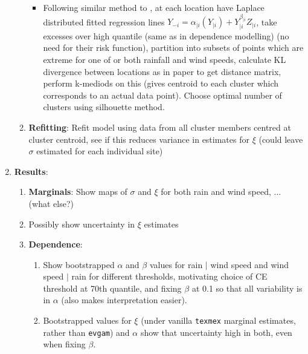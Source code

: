 \documentclass{article}
\numberwithin{equation}{section}
\begin{document}
\begin{enumerate}
\begin{enumerate}
        \begin{itemize}
          \item Following similar method to \cite{Vignotto2021}, at each location have Laplace distributed fitted regression lines $Y_{-i} = \alpha_{\mid i}(Y_{\mid i}) + Y_{\mid i}^{\beta_{\mid i}} Z_{\mid i}$, take excesses over high quantile (same as in dependence modelling) (no need for their risk function), partition into subsets of points which are extreme for one of or both rainfall and wind speeds, calculate KL divergence between locations as in paper to get distance matrix, perform k-mediods on this (gives centroid to each cluster which corresponds to an actual data point). Choose optimal number of clusters using silhouette method. 
        \end{itemize}
      \item \textbf{Refitting}: Refit model using data from all cluster members centred at cluster centroid, see if this reduces variance in estimates for $\xi$ (could leave $\sigma$ estimated for each individual site) 
    \end{enumerate}
  \item \textbf{Results}: 
    \begin{enumerate}
      \item \textbf{Marginals}: Show maps of $\sigma$ and $\xi$ for both rain and wind speed, $\ldots$ (what else?)
      \item Possibly show uncertainty in $\xi$ estimates
      \item \textbf{Dependence}:
        \begin{enumerate}
          \item Show bootstrapped $\alpha$ and $\beta$ values for rain $\mid$ wind speed and wind speed $\mid$ rain for different thresholds, motivating choice of CE threshold at 70th quantile, and fixing $\beta$ at 0.1 so that all variability is in $\alpha$ (also makes interpretation easier). 
          \item Bootstrapped values for $\xi$ (under vanilla \texttt{texmex} marginal estimates, rather than \texttt{evgam}) and $\alpha$ show that uncertainty high in both, even when fixing $\beta$. 

\end{enumerate}
\end{enumerate}
\end{enumerate}
\end{document}

